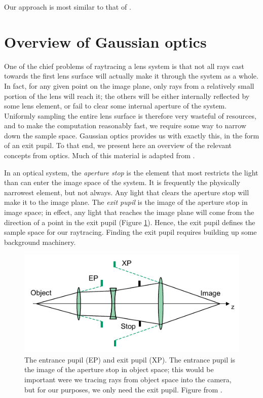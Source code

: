 \documentclass[twocolumn]{article}
\begin{document}
Our approach is most similar to that of \cite{Wu2010}.

\section{Overview of Gaussian optics}
One of the chief problems of raytracing a lens system is that not all rays cast
towards the first lens surface will actually make it through the system as a whole.
In fact, for any given point on the image plane, only rays from a relatively small
portion of the lens will reach it; the others will be either internally reflected by
some lens element, or fail to clear some internal aperture of the system. Uniformly
sampling the entire lens surface is
therefore very wasteful of resources, and to make the computation reasonably fast,
we require some way to narrow down the sample space. Gaussian optics provides us
with exactly this, in the form of an exit pupil. To that end, we present here an
overview of the relevant concepts from optics. Much of
this material is adapted from \cite{Greivenkamp2004}.

In an optical system, the \emph{aperture stop} is the element that most
restricts the light than can enter the image space of the system. It is
frequently the physically narrowest element, but not always. Any light that
clears the aperture stop will make it to the image plane. The
\emph{exit pupil} is the image of the aperture stop in image space; in effect,
any light that reaches the image plane will come from the direction of a point in
the exit pupil (Figure \ref{fig:pupils}). Hence, the exit pupil defines the sample
space for our raytracing.
Finding the exit pupil requires building up some background machinery.

\begin{figure}
    \centering
    \includegraphics[width=.45\textwidth]{img/pupils.png}
    \caption{The entrance pupil (EP) and exit pupil (XP). The entrance pupil is
    the image of the aperture stop in object space; this would be important were
    we tracing rays from object space into the camera, but for our purposes, we only
    need the exit pupil. Figure from \cite{Greivenkamp2004}.}
    \label{fig:pupils}
\end{figure}
\end{document}
